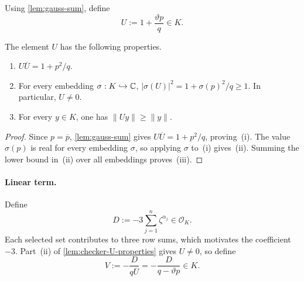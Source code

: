 Using \cref{lem:gauss-sum}, define
\begin{equation}
\label{eq:checker-U}
 U:=1+\frac{\vartheta p}{q}\in K.
\end{equation}

\begin{lemma}
\label{lem:checker-U-properties}
The element $U$ has the following properties.
\begin{enumerate}[label=(\roman*)]
 \item $U\overline U=1+p^2/q$.
 \item For every embedding $\sigma:K\hookrightarrow\mathbb C$,
 $|\sigma(U)|^2=1+\sigma(p)^2/q\ge1$.  In particular, $U\ne0$.
 \item For every $y\in K$, one has
 $\|Uy\|\ge\|y\|$.
\end{enumerate}
\end{lemma}

\begin{proof}
Since $p=\overline p$, \cref{lem:gauss-sum} gives
$U\overline U=1+p^2/q$, proving~(i).  The value $\sigma(p)$ is real for every
embedding $\sigma$, so applying $\sigma$ to~(i) gives~(ii).  Summing the
lower bound in~(ii) over all embeddings proves~(iii).
\end{proof}

\paragraph{Linear term.}
Define
\begin{equation*}
 D:=-3\sum_{j=1}^n\zeta^{\alpha_j}\in \mathcal{O}_K.
\end{equation*}
Each selected set contributes to three row sums, which motivates
the coefficient $-3$.  Part~(ii) of \cref{lem:checker-U-properties} gives
$U\ne0$, so define
\begin{equation}
\label{eq:checker-V}
 V:=-\frac{D}{q\overline U}
   =-\frac{D}{q-\vartheta p}\in K.
\end{equation}


